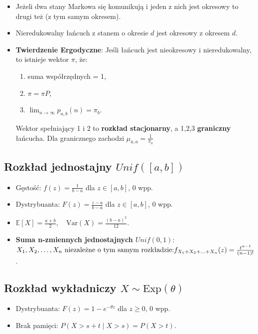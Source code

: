 \documentclass{article}
\theoremstyle{definition}
\theoremstyle{remark}
\begin{document}
\begin{multicols}{2}
\begin{itemize}[itemsep=0pt, left=0pt]
        \item Jeżeli dwa stany Markowa się komunikują i jeden z nich jest okresowy to drugi też (z tym samym okresem).
        \item Nieredukowalny łańcuch z stanem o okresie \(d\) jest okresowy z okresem \(d\).
        \item \textbf{Twierdzenie Ergodyczne}: Jeśli łańcuch jest nieokresowy i nieredukowalny, to istnieje wektor \(\pi\), że:
        \begin{enumerate}[itemsep=0pt, left=0pt, topsep=0pt]
            \item suma współrzędnych = 1,
            \item \(\pi = \pi P\),
            \item \(\lim_{n \to \infty} p_{a,b}(n) = \pi_b\).
        \end{enumerate}  
        Wektor spełniający 1 i 2 to \textbf{rozkład stacjonarny}, a 1,2,3 \textbf{graniczny} łańcucha. Dla granicznego zachodzi \(\mu_{a,a} = \frac{1}{\pi_a}\)
    \end{itemize}

    \subsection*{Rozkład jednostajny \(Unif([a, b]) \)}
    \begin{itemize}[itemsep=0pt, left=0pt]
        \item Gęstość: \( f(z) = \frac{1}{b-a} \) dla \( z \in [a, b] \), 0 wpp.
        \item Dystrybuanta: \( F(z) = \frac{z-a}{b-a} \) dla \( z \in [a, b] \), 0 wpp.
        \item \(\mathbb{E}[X] = \frac{a+b}{2}, \quad \text{Var}(X) = \frac{(b-a)^2}{12}\).
        \item \textbf{Suma n-zmiennych jednostajnych \(Unif(0,1)\)}: \(X_1, X_2, \ldots, X_n \\
        \text{ niezależne o tym samym rozkładzie:} \\
         f_{X_1 + X_2 + \ldots + X_n}(z) =  \frac{t^{n-1}}{(n-1)!}\).
    \end{itemize}

    \subsection*{Rozkład wykładniczy \( X \sim \text{Exp}(\theta) \)}
    \begin{itemize}[itemsep=0pt, left=0pt]
        \item Dystrybuanta: \( F(z) = 1 - e^{-\theta z} \) dla \( z \geq 0 \), 0 wpp.
        \item Brak pamięci: \( P(X > s+t \mid X > s) = P(X > t) \). 
          

\end{itemize}
\end{multicols}
\end{document}
